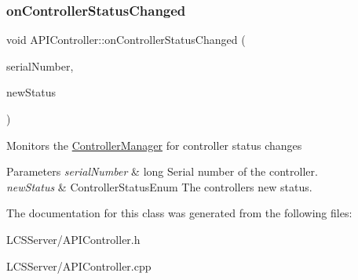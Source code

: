 \subsubsection{\texorpdfstring{on\+Controller\+Status\+Changed}{onControllerStatusChanged}}
{\footnotesize\ttfamily void A\+P\+I\+Controller\+::on\+Controller\+Status\+Changed (\begin{DoxyParamCaption}\item[{long}]{serial\+Number,  }\item[{\hyperlink{_global_defs_8h_a51207b6a49e0da6f9978a3019d93480a}{Controller\+Status\+Enum}}]{new\+Status }\end{DoxyParamCaption})\hspace{0.3cm}{\ttfamily [slot]}}

Monitors the \hyperlink{class_controller_manager}{Controller\+Manager} for controller status changes 
\begin{DoxyParams}{Parameters}
{\em serial\+Number} & long Serial number of the controller. \\
\hline
{\em new\+Status} & Controller\+Status\+Enum The controller\textquotesingle{}s new status. \\
\hline
\end{DoxyParams}


The documentation for this class was generated from the following files\+:\begin{DoxyCompactItemize}
\item 
L\+C\+S\+Server/A\+P\+I\+Controller.\+h\item 
L\+C\+S\+Server/A\+P\+I\+Controller.\+cpp\end{DoxyCompactItemize}

